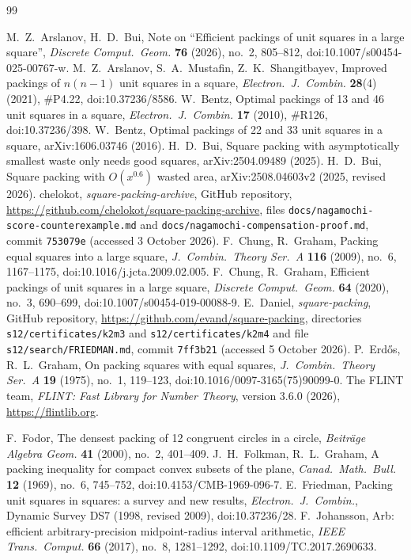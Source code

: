 \documentclass[11pt]{amsart}
\theoremstyle{definition}
\theoremstyle{remark}
\begin{document}
\begin{thebibliography}{99}
\raggedright
{} M.~Z.~Arslanov, H.~D.~Bui, Note on ``Efficient packings of unit squares in a large square'',
\emph{Discrete Comput.\ Geom.} \textbf{76} (2026), no.~2, 805--812, doi:10.1007/s00454-025-00767-w.
 M.~Z.~Arslanov, S.~A.~Mustafin, Z.~K.~Shangitbayev, Improved packings of $n(n-1)$ unit squares in a square,
\emph{Electron.\ J.\ Combin.} \textbf{28}(4) (2021), \#P4.22, doi:10.37236/8586.
 W.~Bentz, Optimal packings of 13 and 46 unit squares in a square, \emph{Electron.\ J.\ Combin.} \textbf{17}
(2010), \#R126, doi:10.37236/398.
 W.~Bentz, Optimal packings of 22 and 33 unit squares in a square, arXiv:1606.03746 (2016).
 H.~D.~Bui, Square packing with asymptotically smallest waste only needs good squares,
arXiv:2504.09489 (2025).
 H.~D.~Bui, Square packing with $O(x^{0.6})$ wasted area, arXiv:2508.04603v2 (2025, revised 2026).
 chelokot, \emph{square-packing-archive}, GitHub repository,
\url{https://github.com/chelokot/square-packing-archive}, files \texttt{docs/nagamochi-score-counterexample.md} and
\texttt{docs/nagamochi-compensation-proof.md}, commit \texttt{753079e} (accessed 3 October 2026).
 F.~Chung, R.~Graham, Packing equal squares into a large square, \emph{J.\ Combin.\ Theory Ser.\ A}
\textbf{116} (2009), no.~6, 1167--1175, doi:10.1016/j.jcta.2009.02.005.
 F.~Chung, R.~Graham, Efficient packings of unit squares in a large square, \emph{Discrete Comput.\ Geom.}
\textbf{64} (2020), no.~3, 690--699, doi:10.1007/s00454-019-00088-9.
 E.~Daniel, \emph{square-packing}, GitHub repository, \url{https://github.com/evand/square-packing},
directories \texttt{s12/certificates/k2m3} and \texttt{s12/certificates/k2m4} and file \texttt{s12/search/FRIEDMAN.md}, commit \texttt{7ff3b21} (accessed 5 October 2026).
 P.~Erd\H{o}s, R.~L.~Graham, On packing squares with equal squares, \emph{J.\ Combin.\ Theory Ser.\ A}
\textbf{19} (1975), no.~1, 119--123, doi:10.1016/0097-3165(75)90099-0.
 The FLINT team, \emph{FLINT: Fast Library for Number Theory}, version 3.6.0 (2026), \url{https://flintlib.org}.

 F.~Fodor, The densest packing of 12 congruent circles in a circle, \emph{Beitr\"age Algebra Geom.}
\textbf{41} (2000), no.~2, 401--409.
 J.~H.~Folkman, R.~L.~Graham, A packing inequality for compact convex subsets of the plane,
\emph{Canad.\ Math.\ Bull.} \textbf{12} (1969), no.~6, 745--752, doi:10.4153/CMB-1969-096-7.
 E.~Friedman, Packing unit squares in squares: a survey and new results, \emph{Electron.\ J.\ Combin.},
Dynamic Survey DS7 (1998, revised 2009), doi:10.37236/28.
 F.~Johansson, Arb: efficient arbitrary-precision midpoint-radius interval arithmetic, \emph{IEEE Trans.\ Comput.}
\textbf{66} (2017), no.~8, 1281--1292, doi:10.1109/TC.2017.2690633.


\end{thebibliography}
\end{document}

